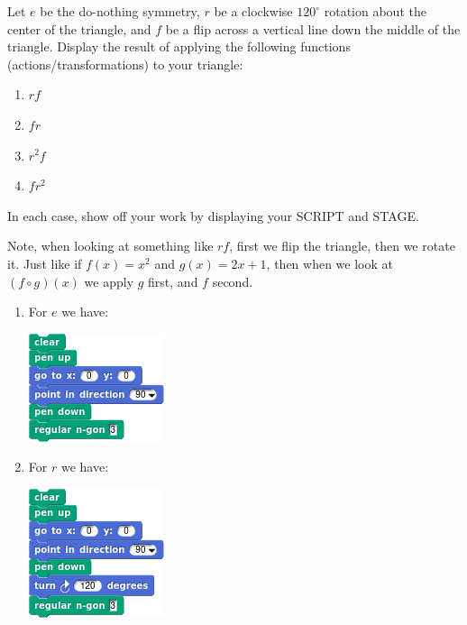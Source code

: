 \documentclass[noauthor,nooutcomes,hints,handout]{ximera}
\begin{document}
\begin{question}
  Let $e$ be the do-nothing symmetry, $r$ be a clockwise $120^\circ$
  rotation about the center of the triangle, and $f$ be a flip across
  a vertical line down the middle of the triangle. Display the result
  of applying the following functions (actions/transformations) to
  your triangle:
  \begin{enumerate}
  \item $rf$
  \item $fr$
  \item $r^2 f$
  \item $f r^2$
  \end{enumerate}
  In each case, show off your work by displaying your SCRIPT and
  STAGE.
  \begin{hint}
    Note, when looking at something like $rf$, first we flip the
    triangle, then we rotate it. Just like if $f(x) = x^2$ and $g(x) =
    2x+1$, then when we look at $(f\circ g)(x)$ we apply $g$ first,
    and $f$ second.
  \end{hint}
  \begin{freeResponse}
    \begin{enumerate}
    \item For $e$ we have:
      \begin{center}
        \includegraphics[width=.3\textwidth]{eTriSCRIPT.png}   \qquad {}
      \end{center}
    \item For $r$ we have:
      \begin{center}
        \includegraphics[width=.3\textwidth]{rTriSCRIPT.png}   \qquad {}

\end{center}
\end{enumerate}
\end{freeResponse}
\end{question}
\end{document}
